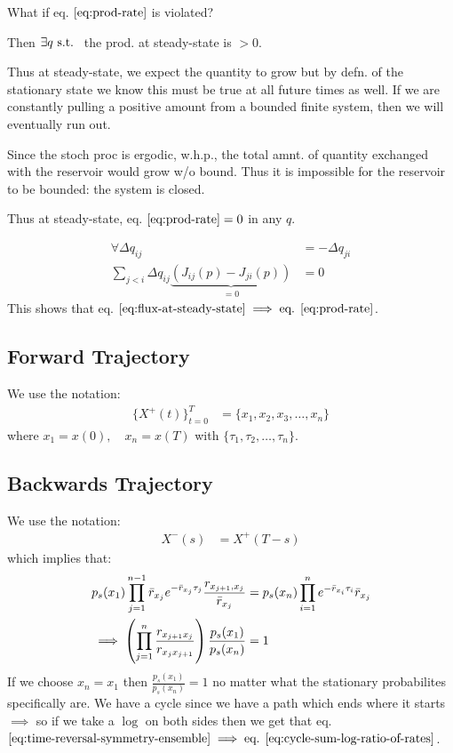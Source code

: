 \begin{important}
What if eq. $\eqref{eq:prod-rate}$ is violated?
\end{important}

Then $\exists q\text{ s.t. }$ the prod. at steady-state is $>0$.

Thus at steady-state, we expect the  quantity to grow but by defn. of the stationary state we know this must be true at all future times as well. If we are constantly pulling a positive amount from a bounded finite system, then we will eventually run out.

Since the stoch proc is ergodic, w.h.p., the total amnt. of quantity exchanged with the reservoir would grow w/o bound. Thus it is impossible for the reservoir to be bounded: the system is closed.

Thus at steady-state,  eq. $\eqref{eq:prod-rate}=0$ in any $q$.

\begin{align*}
\forall \Delta q_{ij} &= -\Delta q_{ji} 
\\
\sum_{j < i} \Delta q_{ij} \underbrace{\left(J_{ij}(p) - J_{ji}(p)\right)}_{=0} &= 0
\end{align*}
This shows that eq. $\eqref{eq:flux-at-steady-state}\implies\text{eq. }\eqref{eq:prod-rate}$.

\subsection{Forward Trajectory}
We use the notation:
\begin{align*}
    \{
    X^+(t)
    \}_{t=0}^T
    &= \{x_1, x_2, x_3, \ldots, x_n\}
\end{align*}
where $x_1=x(0), \quad x_n=x(T)$ with $\{\tau_1, \tau_2, \ldots, \tau_n\}$.

\subsection{Backwards Trajectory}
We use the notation:
\begin{align*}
    X^-(s)
    &= X^+(T-s)
\end{align*}
which implies that:
\begin{align}
    p_s(x_1)\prod_{j=1}^{n-1} \Bar{r}_{x_j} e^{-\Bar{r}_{x_j}\tau_j} \frac{r_{x_{j+1}, x_j}}{\Bar{r}_{x_j}}
    &= 
    p_s(x_n)\prod_{i=1}^{n} 
    e^{-\Bar{r}_{x_i}\tau_i} 
    \Bar{r}_{x_j} \\
    \implies \left(\prod_{j=1}^n \frac{r_{x_{j+1} x_j}}{r_{x_j x_{j+1}}} \right) \frac{p_s(x_1)}{p_s(x_n)} &= 1
\end{align}
If we choose $x_n=x_1$ then $\frac{p_s(x_1)}{p_s(x_n)}=1$ no matter what the stationary probabilites specifically are. We have a cycle since we have a path which ends where it starts $\implies$ so if we take a $\log$ on both sides then we get that eq. $\eqref{eq:time-reversal-symmetry-ensemble}\implies\text{eq. }\eqref{eq:cycle-sum-log-ratio-of-rates}$.

